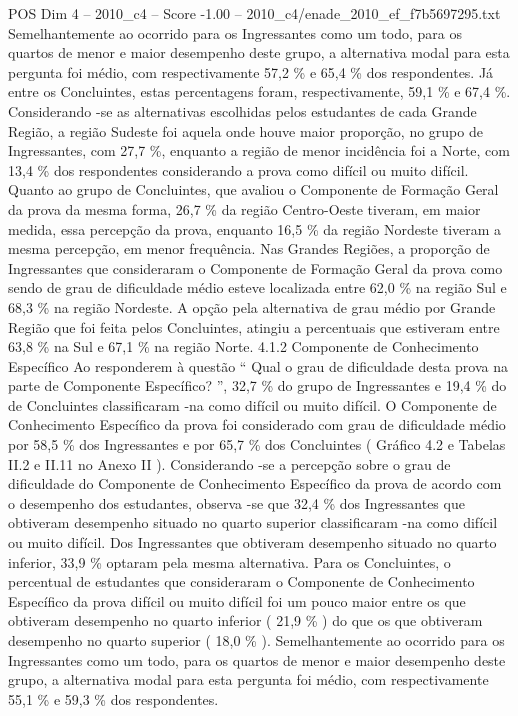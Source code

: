 \begin{textsample}{POS Dim 4 – 2010\_c4 – Score -1.00 – 2010\_c4/enade\_2010\_ef\_f7b5697295.txt}
Semelhantemente ao ocorrido para os Ingressantes como um todo, para os quartos de menor e maior desempenho deste grupo, a alternativa modal para esta pergunta foi médio, com respectivamente 57,2 \% e 65,4 \% dos respondentes.
Já entre os Concluintes, estas percentagens foram, respectivamente, 59,1 \% e 67,4 \%.
Considerando -se as alternativas escolhidas pelos estudantes de cada Grande Região, a região Sudeste foi aquela onde houve maior proporção, no grupo de Ingressantes, com 27,7 \%, enquanto a região de menor incidência foi a Norte, com 13,4 \% dos respondentes considerando a prova como difícil ou muito difícil.
Quanto ao grupo de Concluintes, que avaliou o Componente de Formação Geral da prova da mesma forma, 26,7 \% da região Centro-Oeste tiveram, em maior medida, essa percepção da prova, enquanto 16,5 \% da região Nordeste tiveram a mesma percepção, em menor frequência.
Nas Grandes Regiões, a proporção de Ingressantes que consideraram o Componente de Formação Geral da prova como sendo de grau de dificuldade médio esteve localizada entre 62,0 \% na região Sul e 68,3 \% na região Nordeste.
A opção pela alternativa de grau médio por Grande Região que foi feita pelos Concluintes, atingiu a percentuais que estiveram entre 63,8 \% na Sul e 67,1 \% na região Norte. 4.1.2 Componente de Conhecimento Específico Ao responderem à questão “ Qual o grau de dificuldade desta prova na parte de Componente Específico? ”, 32,7 \% do grupo de Ingressantes e 19,4 \% do de Concluintes classificaram -na como difícil ou muito difícil.
O Componente de Conhecimento Específico da prova foi considerado com grau de dificuldade médio por 58,5 \% dos Ingressantes e por 65,7 \% dos Concluintes ( Gráfico 4.2 e Tabelas II.2 e II.11 no Anexo II ).
Considerando -se a percepção sobre o grau de dificuldade do Componente de Conhecimento Específico da prova de acordo com o desempenho dos estudantes, observa -se que 32,4 \% dos Ingressantes que obtiveram desempenho situado no quarto superior classificaram -na como difícil ou muito difícil.
Dos Ingressantes que obtiveram desempenho situado no quarto inferior, 33,9 \% optaram pela mesma alternativa.
Para os Concluintes, o percentual de estudantes que consideraram o Componente de Conhecimento Específico da prova difícil ou muito difícil foi um pouco maior entre os que obtiveram desempenho no quarto inferior ( 21,9 \% ) do que os que obtiveram desempenho no quarto superior ( 18,0 \% ).
Semelhantemente ao ocorrido para os Ingressantes como um todo, para os quartos de menor e maior desempenho deste grupo, a alternativa modal para esta pergunta foi médio, com respectivamente 55,1 \% e 59,3 \% dos respondentes.

\end{textsample}
